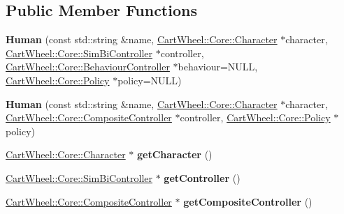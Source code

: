 \subsection*{Public Member Functions}
\begin{DoxyCompactItemize}
\item 
\hypertarget{classCartWheel_1_1Core_1_1Human_ab4fbcfc558fa6935362df9a6797d38dc}{
{\bfseries Human} (const std::string \&name, \hyperlink{classCartWheel_1_1Core_1_1Character}{CartWheel::Core::Character} $\ast$character, \hyperlink{classCartWheel_1_1Core_1_1SimBiController}{CartWheel::Core::SimBiController} $\ast$controller, \hyperlink{classCartWheel_1_1Core_1_1BehaviourController}{CartWheel::Core::BehaviourController} $\ast$behaviour=NULL, \hyperlink{classCartWheel_1_1Core_1_1Policy}{CartWheel::Core::Policy} $\ast$policy=NULL)}
\label{classCartWheel_1_1Core_1_1Human_ab4fbcfc558fa6935362df9a6797d38dc}

\item 
\hypertarget{classCartWheel_1_1Core_1_1Human_a4d9cc118087bb0ed026bdb885967d21b}{
{\bfseries Human} (const std::string \&name, \hyperlink{classCartWheel_1_1Core_1_1Character}{CartWheel::Core::Character} $\ast$character, \hyperlink{classCartWheel_1_1Core_1_1CompositeController}{CartWheel::Core::CompositeController} $\ast$controller, \hyperlink{classCartWheel_1_1Core_1_1Policy}{CartWheel::Core::Policy} $\ast$policy)}
\label{classCartWheel_1_1Core_1_1Human_a4d9cc118087bb0ed026bdb885967d21b}

\item 
\hypertarget{classCartWheel_1_1Core_1_1Human_ad520b56274e80733590918f8445935ca}{
\hyperlink{classCartWheel_1_1Core_1_1Character}{CartWheel::Core::Character} $\ast$ {\bfseries getCharacter} ()}
\label{classCartWheel_1_1Core_1_1Human_ad520b56274e80733590918f8445935ca}

\item 
\hypertarget{classCartWheel_1_1Core_1_1Human_a06d07a557b2efe941107e1da74fa6e11}{
\hyperlink{classCartWheel_1_1Core_1_1SimBiController}{CartWheel::Core::SimBiController} $\ast$ {\bfseries getController} ()}
\label{classCartWheel_1_1Core_1_1Human_a06d07a557b2efe941107e1da74fa6e11}

\item 
\hypertarget{classCartWheel_1_1Core_1_1Human_ac7b2a709248efd852af5d19a1aabf55a}{
\hyperlink{classCartWheel_1_1Core_1_1CompositeController}{CartWheel::Core::CompositeController} $\ast$ {\bfseries getCompositeController} ()}
\label{classCartWheel_1_1Core_1_1Human_ac7b2a709248efd852af5d19a1aabf55a}


\end{DoxyCompactItemize}

